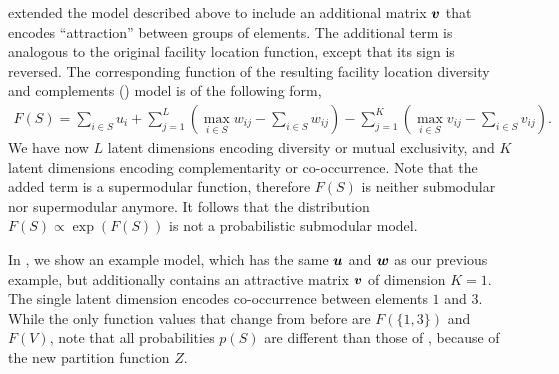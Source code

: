 \begin{example}[\fldc{}] \label{ex:fldc}
\cite{djolonga16mixed} extended the \flid{} model described above to include an additional matrix $\bm{v}$ that encodes ``attraction'' between groups of elements.
The additional term is analogous to the original facility location function, except that its sign is reversed.
The corresponding function of the resulting facility location diversity and complements (\fldc{}) model is of the following form,
\begin{align*}
F(S) = \sum_{i \in S} u_i + \sum_{j=1}^{L} \left(\max_{i \in S} w_{ij} - \sum_{i \in S} w_{ij}\right) - \sum_{j=1}^{K} \left(\max_{i \in S} v_{ij} - \sum_{i \in S} v_{ij}\right).
\end{align*}
We have now $L$ latent dimensions encoding diversity or mutual exclusivity, and $K$ latent dimensions encoding complementarity or co-occurrence.
Note that the added term is a supermodular function, therefore $F(S)$ is neither submodular nor supermodular anymore.
It follows that the distribution $F(S) \propto \exp(F(S))$ is not a probabilistic submodular model.

In , we show an example \fldc{} model, which has the same $\bm{u}$ and $\bm{w}$ as our previous \flid{} example, but additionally contains an attractive matrix $\bm{v}$ of dimension $K = 1$.
The single latent dimension encodes co-occurrence between elements $1$ and $3$.
While the only function values that change from before are $F(\{1, 3\})$ and $F(V)$, note that all probabilities $p(S)$ are different than those of , because of the new partition function $Z$.


\end{example}
